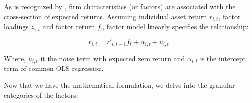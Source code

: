 \documentclass[
]{book}
\begin{document}
As is recognized by \citet{fama1993common}, firm characteristics (or factors) are associated with the cross-section of expected returns. Assuming individual asset return \(r_{i,t}\), factor loadings \(z_{i,t}\) and factor return \(f_t\), factor model linearly specifies the relationship:

\begin{equation} 
r_{i,t} = z'_{i,t-1}  f_t + \alpha_{i,t} + u_{i,t}
\label{eq:facmodel}
\end{equation}

Where, \(u_{i,t}\) it the noise term with expected zero return and \(\alpha_{i,t}\) is the intercept term of common OLS regression.

Now that we have the mathematical formulation, we delve into the granular categories of the factors:
\end{document}
